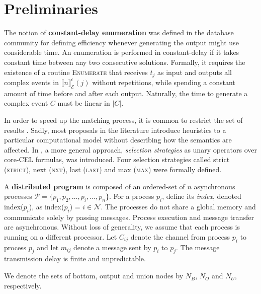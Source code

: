 \chapter{Preliminaries}\label{chapter:preliminaries}

The notion of \textbf{constant-delay enumeration} was defined in the database community \cite{constant-delay-1, constant-delay-2} for defining efficiency whenever generating the output might use considerable time. An enumeration is performed in constant-delay if it takes constant time between any two consecutive solutions. Formally, it requires the existence of a routine \textsc{Enumerate} that receives $t_{j}$ as input and outputs all complex events in $\llbracket n \rrbracket^{\epsilon}_{\mathcal{E}}(j)$ without repetitions, while spending a constant amount of time before and after each output. Naturally, the time to generate a complex event $C$ must be linear in $|C|$.





In order to speed up the matching process, it is common to restrict the set of results \cite{10.1016/j.scico.2010.06.010, 10.1145/1142473.1142520, Zhang2014OnCA}. Sadly, most proposals in the literature introduce heuristics to a particular computational model without describing how the semantics are affected. In \cite{formal-framework-cer}, a more general approach, \emph{selection strategies} as unary operators over core-CEL formulas, was introduced. Four selection strategies called strict (\textsc{strict}), next (\textsc{nxt}), last (\textsc{last}) and max (\textsc{max}) were formally defined.


A \textbf{distributed program} is composed of an ordered-set of $n$ asynchronous processes $\mathcal{P} = \{ p_{1}, p_{2}, \ldots, p_{i}, \ldots, p_{n}\}$. For a process $p_{i}$, define its \emph{index}, denoted index($p_{i}$), as index($p_{i}$) = $i \in \mathcal{N}$. The processes do not share a global memory and communicate solely by passing messages. Process execution and message transfer are asynchronous. Without loss of generality, we assume that each process is running on a different processor. Let $C_{ij}$ denote the channel from process $p_{i}$ to process $p_{j}$ and let $m_{ij}$ denote a message sent by $p_{i}$ to $p_{j}$. The message transmission delay is finite and unpredictable.



We denote the sets of bottom, output and union nodes by $N_{B}$, $N_{O}$ and $N_{U}$, respectively.
